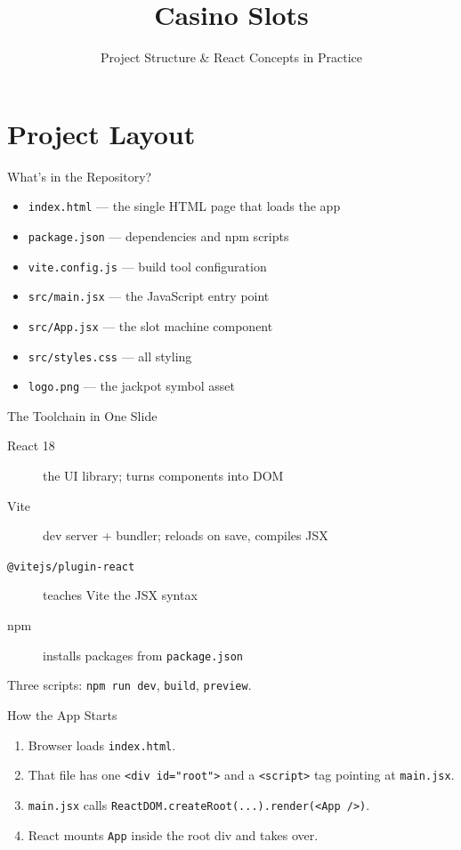 \documentclass{beamer}
\title{Casino Slots}
\subtitle{Project Structure \& React Concepts in Practice}
\author{}
\date{}
\begin{document}
\maketitle

\section{Project Layout}

\begin{frame}{What's in the Repository?}
  \begin{itemize}
    \item \texttt{index.html} --- the single HTML page that loads the app
    \item \texttt{package.json} --- dependencies and npm scripts
    \item \texttt{vite.config.js} --- build tool configuration
    \item \texttt{src/main.jsx} --- the JavaScript entry point
    \item \texttt{src/App.jsx} --- the slot machine component
    \item \texttt{src/styles.css} --- all styling
    \item \texttt{logo.png} --- the jackpot symbol asset
  \end{itemize}
\end{frame}

\begin{frame}{The Toolchain in One Slide}
  \begin{description}
    \item[React 18] the UI library; turns components into DOM
    \item[Vite] dev server + bundler; reloads on save, compiles JSX
    \item[\texttt{@vitejs/plugin-react}] teaches Vite the JSX syntax
    \item[npm] installs packages from \texttt{package.json}
  \end{description}
  \vfill
  Three scripts: \texttt{npm run dev}, \texttt{build}, \texttt{preview}.
\end{frame}

\begin{frame}{How the App Starts}
  \begin{enumerate}
    \item Browser loads \texttt{index.html}.
    \item That file has one \texttt{<div id="root">} and a \texttt{<script>} tag pointing at \texttt{main.jsx}.
    \item \texttt{main.jsx} calls \texttt{ReactDOM.createRoot(...).render(<App />)}.
    \item React mounts \texttt{App} inside the root div and takes over.
  \end{enumerate}
\end{frame}
\end{document}
